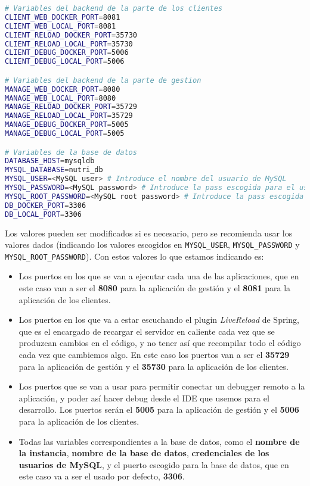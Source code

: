 \begin{lstlisting}[language=Bash]
# Variables del backend de la parte de los clientes
CLIENT_WEB_DOCKER_PORT=8081
CLIENT_WEB_LOCAL_PORT=8081
CLIENT_RELOAD_DOCKER_PORT=35730
CLIENT_RELOAD_LOCAL_PORT=35730
CLIENT_DEBUG_DOCKER_PORT=5006
CLIENT_DEBUG_LOCAL_PORT=5006

# Variables del backend de la parte de gestion
MANAGE_WEB_DOCKER_PORT=8080
MANAGE_WEB_LOCAL_PORT=8080
MANAGE_RELOAD_DOCKER_PORT=35729
MANAGE_RELOAD_LOCAL_PORT=35729
MANAGE_DEBUG_DOCKER_PORT=5005
MANAGE_DEBUG_LOCAL_PORT=5005

# Variables de la base de datos
DATABASE_HOST=mysqldb
MYSQL_DATABASE=nutri_db
MYSQL_USER=<MySQL user> # Introduce el nombre del usuario de MySQL
MYSQL_PASSWORD=<MySQL password> # Introduce la pass escogida para el usuario creado en el paso anterior
MYSQL_ROOT_PASSWORD=<MySQL root password> # Introduce la pass escogida para el usuario root de MySQL
DB_DOCKER_PORT=3306
DB_LOCAL_PORT=3306
\end{lstlisting}

Los valores pueden ser modificados si es necesario, pero se recomienda usar los valores dados (indicando los valores escogidos en \verb,MYSQL_USER,, \verb,MYSQL_PASSWORD, y \verb,MYSQL_ROOT_PASSWORD,). Con estos valores lo que estamos indicando es:

\begin{itemize}
	\item Los puertos en los que se van a ejecutar cada una de las aplicaciones, que en este caso van a ser el \textbf{8080} para la aplicación de gestión y el \textbf{8081} para la aplicación de los clientes.
	\item Los puertos en los que va a estar escuchando el plugin \textit{LiveReload} de Spring, que es el encargado de recargar el servidor en caliente cada vez que se produzcan cambios en el código, y no tener así que recompilar todo el código cada vez que cambiemos algo. En este caso los puertos van a ser el \textbf{35729} para la aplicación de gestión y el \textbf{35730} para la aplicación de los clientes.
	\item Los puertos que se van a usar para permitir conectar un debugger remoto a la aplicación, y poder así hacer debug desde el IDE que usemos para el desarrollo. Los puertos serán el \textbf{5005} para la aplicación de gestión y el \textbf{5006} para la aplicación de los clientes.
	\item Todas las variables correspondientes a la base de datos, como el \textbf{nombre de la instancia}, \textbf{nombre de la base de datos}, \textbf{credenciales de los usuarios de MySQL}, y el puerto escogido para la base de datos, que en este caso va a ser el usado por defecto, \textbf{3306}. 
\end{itemize}

